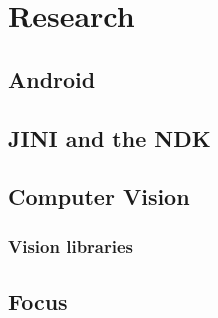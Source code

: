 \chapter{Research}

\section{Android}

\section{JINI and the NDK}

\section{Computer Vision}
\subsection{Vision libraries}

\section{Focus}
